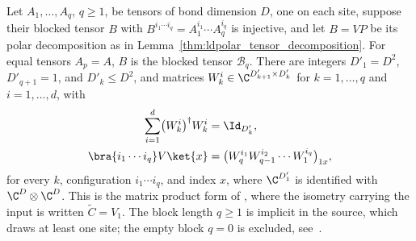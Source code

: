 


\begin{lemma}
    \label{thm:ldp_sequential_factorization}
    \leanok
    Let $A_1,\dots,A_q$, $q\ge1$, be tensors of bond dimension $D$, one on each
    site, suppose their blocked tensor $B$ with
    $B^{i_1\cdots i_q}=A_1^{i_1}\cdots A_q^{i_q}$ is injective, and let $B=VP$
    be its polar decomposition as in
    Lemma~\ref{thm:ldpolar_tensor_decomposition}. For equal tensors $A_p=A$,
    $B$ is the blocked tensor $\mathcal B_q$. There are integers
    $D'_1=D^2$, $D'_{q+1}=1$, and $D'_k\le D^2$, and matrices
    $W_k^i\in\C^{D'_{k+1}\times D'_k}$ for $k=1,\dots,q$ and $i=1,\dots,d$, with
    \begin{align}
        \sum_{i=1}^d\bigl(W_k^i\bigr)^\dagger W_k^i
         & =\Id_{D'_k},
        \label{eq:ldp_sequential_factorization_isometry}             \\
        \bra{i_1\cdots i_q}V\ket{x}
         & =\bigl(W_q^{i_1}W_{q-1}^{i_2}\cdots W_1^{i_q}\bigr)_{1x},
        \label{eq:ldp_sequential_factorization_matrix_product}
    \end{align}
    for every $k$, configuration $i_1\cdots i_q$, and index $x$, where $\C^{D'_1}$ is
    identified with $\C^D\otimes\C^D$. This is the matrix product form of
    \cite[eqs.~(13)--(15)]{Malz2024Preparation}, where the isometry carrying the
    input is written $\widetilde C=V_1$. The block length $q\ge1$ is implicit
    in the source, which draws at least one site; the empty block $q=0$ is
    excluded, see~\cite{gap:mswc24_sequential_factorization_positive_block_length}.
\end{lemma}

